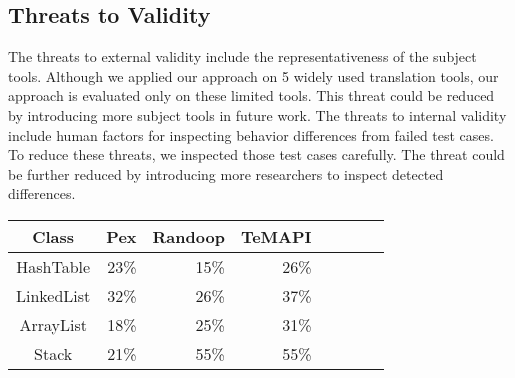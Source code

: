 \subsection{Threats to Validity}
\label{sec:evaluation:threat}
The threats to external validity include the representativeness of the subject tools. Although we applied
our approach on 5 widely used translation tools, our approach is evaluated only on these limited tools. This threat could be reduced by introducing more subject tools in future work. The threats to internal validity include human factors for inspecting behavior differences from failed test cases. To reduce these threats, we inspected those test cases carefully. The threat could be further
reduced by introducing more researchers to inspect detected differences.
\begin{table}[t]
\centering
\begin{SmallOut}
\begin {tabular} {|c|r|r|r|r|r|c|c|}
 \hline
\textbf{Class}& \textbf{Pex} & \textbf{Randoop}
& \textbf{TeMAPI} \\
\hline
HashTable                      &  23\%  & 15\%  &  26\%\\
\hline
LinkedList                     &  32\%  & 26\%  & 37\%\\
\hline
ArrayList                      &  18\%  & 25\%  &  31\%\\
\hline
Stack                          &  21\%   & 55\%  &  55\%\\
\hline
\end{tabular}\vspace*{-2ex}
 \label{table:coverageconverter}
\end{SmallOut}\vspace*{-2ex}
\end{table} 